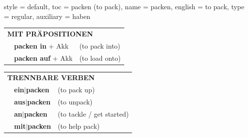 \begin{verbentry}{
  style = {default},
  toc = {packen (to pack)},
  name = {packen},
  english = {to pack},
  type = {regular},
  auxiliary = {haben}
}
\vspace{10pt}

\begin{tabular}{lll}
\multicolumn{3}{l}{\textbf{MIT PRÄPOSITIONEN}}\\
& \textbf{packen in} + Akk & (to pack into)\\
& \textbf{packen auf} + Akk & (to load onto)\\
\end{tabular}
\hfill
\begin{tabular}{lll}
\multicolumn{3}{l}{\textbf{TRENNBARE VERBEN}}\\
& \textbf{ein$|$packen} & (to pack up)\\
& \textbf{aus$|$packen} & (to unpack)\\
& \textbf{an$|$packen} & (to tackle / get started)\\
& \textbf{mit$|$packen} & (to help pack)\\
\end{tabular}
\vspace{-5pt}
\end{verbentry}

